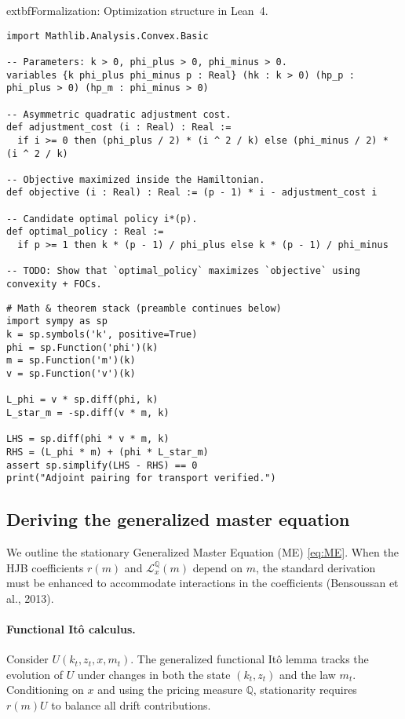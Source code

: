 \documentclass[11pt,letterpaper,oneside]{article}
\newcommand{\LxQ}{\mathcal{L}_x^{\mathbb{Q}}}
\begin{document}
\begin{tcolorbox}[leanproofstyle]
    extbf{Formalization: Optimization structure in Lean~4.}
\begin{verbatim}
import Mathlib.Analysis.Convex.Basic

-- Parameters: k > 0, phi_plus > 0, phi_minus > 0.
variables {k phi_plus phi_minus p : Real} (hk : k > 0) (hp_p : phi_plus > 0) (hp_m : phi_minus > 0)

-- Asymmetric quadratic adjustment cost.
def adjustment_cost (i : Real) : Real :=
  if i >= 0 then (phi_plus / 2) * (i ^ 2 / k) else (phi_minus / 2) * (i ^ 2 / k)

-- Objective maximized inside the Hamiltonian.
def objective (i : Real) : Real := (p - 1) * i - adjustment_cost i

-- Candidate optimal policy i*(p).
def optimal_policy : Real :=
  if p >= 1 then k * (p - 1) / phi_plus else k * (p - 1) / phi_minus

-- TODO: Show that `optimal_policy` maximizes `objective` using convexity + FOCs.
\end{verbatim}
\begin{verbatim}
# Math & theorem stack (preamble continues below)
import sympy as sp
k = sp.symbols('k', positive=True)
phi = sp.Function('phi')(k)
m = sp.Function('m')(k)
v = sp.Function('v')(k)

L_phi = v * sp.diff(phi, k)
L_star_m = -sp.diff(v * m, k)

LHS = sp.diff(phi * v * m, k)
RHS = (L_phi * m) + (phi * L_star_m)
assert sp.simplify(LHS - RHS) == 0
print("Adjoint pairing for transport verified.")
\end{verbatim}
\end{tcolorbox}

\subsection{Deriving the generalized master equation}\label{app:me_derivation}

We outline the stationary Generalized Master Equation (ME) \eqref{eq:ME}. When the HJB coefficients $r(m)$ and $\LxQ(m)$ depend on $m$, the standard derivation must be enhanced to accommodate interactions in the coefficients (Bensoussan et al., 2013).

\paragraph{Functional It\^o calculus.}
Consider $U(k_t,z_t,x,m_t)$. The generalized functional It\^o lemma tracks the evolution of $U$ under changes in both the state $(k_t,z_t)$ and the law $m_t$. Conditioning on $x$ and using the pricing measure $\mathbb{Q}$, stationarity requires $r(m)U$ to balance all drift contributions.
\end{document}
